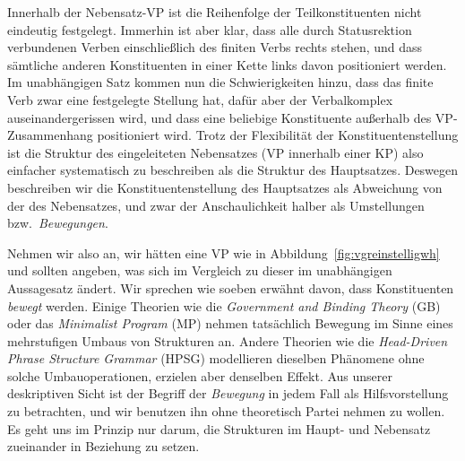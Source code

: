 \begin{exe}
  \ex\label{ex:vkv2inf}
  \begin{xlist}
  \end{xlist}
  \ex\label{ex:vkv2prt}
  \begin{xlist}
  \end{xlist}
\end{exe}


Innerhalb der Nebensatz-VP ist die Reihenfolge der Teilkonstituenten nicht eindeutig festgelegt.
Immerhin ist aber klar, dass alle durch Statusrektion verbundenen Verben einschließlich des finiten Verbs rechts stehen, und dass sämtliche anderen Konstituenten in einer Kette links davon positioniert werden.  
Im unabhängigen Satz kommen nun die Schwierigkeiten hinzu, dass das finite Verb zwar eine festgelegte Stellung hat, dafür aber der Verbalkomplex auseinandergerissen wird, und dass eine beliebige Konstituente außerhalb des VP-Zusammenhang positioniert wird.
Trotz der Flexibilität der Konstituentenstellung ist die Struktur des eingeleiteten Nebensatzes (VP innerhalb einer KP) also einfacher systematisch zu beschreiben als die Struktur des Hauptsatzes.
Deswegen beschreiben wir die Konstituentenstellung des Hauptsatzes als Abweichung von der des Nebensatzes, und zwar der Anschaulichkeit halber als Umstellungen bzw.\ \textit{Bewegungen}.

Nehmen wir also an, wir hätten eine VP wie in Abbildung~\ref{fig:vgreinstelligwh} und sollten angeben, was sich im Vergleich zu dieser im unabhängigen Aussagesatz ändert.
Wir sprechen wie soeben erwähnt davon, dass Konstituenten \textit{bewegt} werden.
Einige Theorien wie \zB die \textit{Government and Binding Theory} (GB) oder das \textit{Minimalist Program} (MP) nehmen tatsächlich Bewegung im Sinne eines mehrstufigen Umbaus von Strukturen an.
Andere Theorien wie die \textit{Head-Driven Phrase Structure Grammar} (HPSG) modellieren dieselben Phänomene ohne solche Umbauoperationen, erzielen aber denselben Effekt.
Aus unserer deskriptiven Sicht ist der Begriff der \textit{Bewegung} in jedem Fall als Hilfsvorstellung zu betrachten, und wir benutzen ihn ohne theoretisch Partei nehmen zu wollen.
Es geht uns im Prinzip nur darum, die Strukturen im Haupt- und Nebensatz zueinander in Beziehung zu setzen.

